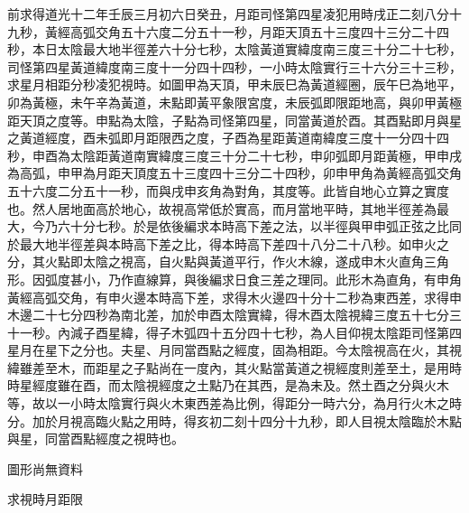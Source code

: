 \begin{pinyinscope}
前求得道光十二年壬辰三月初六日癸丑，月距司怪第四星凌犯用時戌正二刻八分十九秒，黃經高弧交角五十六度二分五十一秒，月距天頂五十三度四十三分二十四秒，本日太陰最大地半徑差六十分七秒，太陰黃道實緯度南三度三十分二十七秒，司怪第四星黃道緯度南三度十一分四十四秒，一小時太陰實行三十六分三十三秒，求星月相距分秒凌犯視時。如圖甲為天頂，甲未辰巳為黃道經圈，辰午巳為地平，卯為黃極，未午辛為黃道，未點即黃平象限宮度，未辰弧即限距地高，與卯甲黃極距天頂之度等。申點為太陰，子點為司怪第四星，同當黃道於酉。其酉點即月與星之黃道經度，酉未弧即月距限西之度，子酉為星距黃道南緯度三度十一分四十四秒，申酉為太陰距黃道南實緯度三度三十分二十七秒，申卯弧即月距黃極，甲申戌為高弧，申甲為月距天頂度五十三度四十三分二十四秒，卯申甲角為黃經高弧交角五十六度二分五十一秒，而與戌申亥角為對角，其度等。此皆自地心立算之實度也。然人居地面高於地心，故視高常低於實高，而月當地平時，其地半徑差為最大，今乃六十分七秒。於是依後編求本時高下差之法，以半徑與甲申弧正弦之比同於最大地半徑差與本時高下差之比，得本時高下差四十八分二十八秒。如申火之分，其火點即太陰之視高，自火點與黃道平行，作火木線，遂成申木火直角三角形。因弧度甚小，乃作直線算，與後編求日食三差之理同。此形木為直角，有申角黃經高弧交角，有申火邊本時高下差，求得木火邊四十分十二秒為東西差，求得申木邊二十七分四秒為南北差，加於申酉太陰實緯，得木酉太陰視緯三度五十七分三十一秒。內減子酉星緯，得子木弧四十五分四十七秒，為人目仰視太陰距司怪第四星月在星下之分也。夫星、月同當酉點之經度，固為相距。今太陰視高在火，其視緯雖差至木，而距星之子點尚在一度內，其火點當黃道之視經度則差至土，是用時時星經度雖在酉，而太陰視經度之土點乃在其西，是為未及。然土酉之分與火木等，故以一小時太陰實行與火木東西差為比例，得距分一時六分，為月行火木之時分。加於月視高臨火點之用時，得亥初二刻十四分十九秒，即人目視太陰臨於木點與星，同當酉點經度之視時也。

圖形尚無資料

求視時月距限


\end{pinyinscope}
